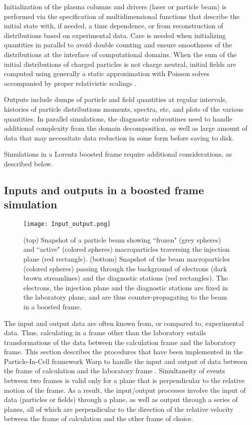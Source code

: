 

Initialization of the plasma columns and drivers (laser or particle beam) is performed via the specification of multidimensional functions that describe the initial state with, if needed, a time dependence, or from reconstruction of distributions based on experimental data. Care is needed when initializing quantities in parallel to avoid double counting and ensure smoothness of the distributions at the interface of computational domains. When the sum of the initial distributions of charged particles is not charge neutral, initial fields are computed using generally a static approximation with Poisson solves accompanied by proper relativistic scalings \cite{Vaypop2008, CowanPRSTAB13}.

Outputs include dumps of particle and field quantities at regular intervals, histories of particle distributions moments, spectra, etc, and plots of the various quantities. In parallel simulations, the diagnostic subroutines need to handle additional complexity from the domain decomposition, as well as large amount of data that may necessitate data reduction in some form before saving to disk.

Simulations in a Lorentz boosted frame require additional considerations, as described below.

\subsection{Inputs and outputs in a boosted frame simulation}
\begin{figure}
   \texttt{[image: Input\_output.png]}
   \caption{(top) Snapshot of a particle beam showing ``frozen" (grey spheres) and ``active" (colored spheres) macroparticles traversing the injection plane (red rectangle). (bottom) Snapshot of the beam macroparticles (colored spheres) passing through the background of electrons (dark brown streamlines) and the diagnostic stations (red rectangles). The electrons, the injection plane and the diagnostic stations are fixed in the laboratory plane, and are thus counter-propagating to the beam in a boosted frame. }
   \label{Fig_inputoutput}
\end{figure}

The input and output data are often known from, or compared to, experimental data. Thus, calculating in
a frame other than the laboratory entails transformations of the data between the calculation frame and the laboratory
frame. This section describes the procedures that have been implemented in the Particle-In-Cell framework Warp \cite{Warp} to handle the input and output of data between the frame of calculation and the laboratory frame \cite{Vaypop2011}. Simultaneity of events between two frames is valid only for a plane that is perpendicular to the relative motion of the frame. As a result, the input/output processes involve the input of data (particles or fields) through a plane, as well as output through a series of planes, all of which are perpendicular to the direction of the relative velocity between the frame of calculation and the other frame of choice.

